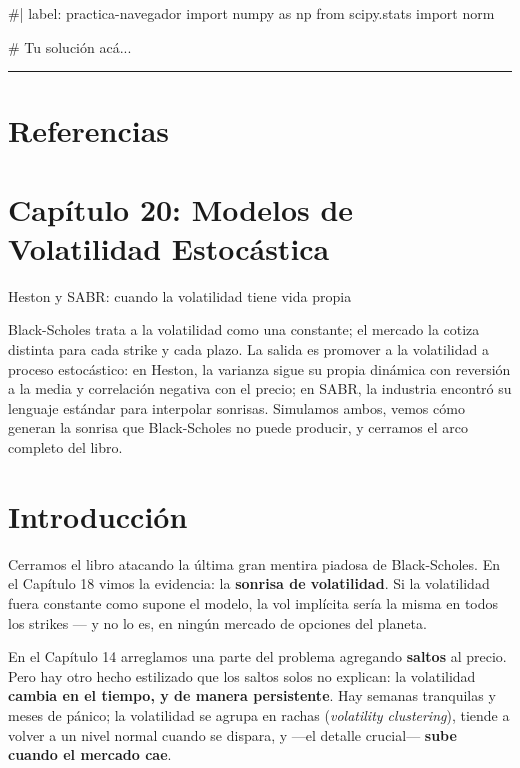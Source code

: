 \documentclass[
  spanish,
  letterpaper,
  DIV=11,
  numbers=noendperiod]{scrreprt}
\newenvironment{Shaded}{\begin{snugshade}}{\end{snugshade}}
\newcommand{\NormalTok}[1]{\textcolor[rgb]{0.00,0.23,0.31}{#1}}
\begin{document}
\begin{Shaded}
\begin{Highlighting}[]
\NormalTok{\#| label: practica{-}navegador}
\NormalTok{import numpy as np}
\NormalTok{from scipy.stats import norm}

\NormalTok{\# Tu solución acá...}
\end{Highlighting}
\end{Shaded}

\begin{center}\rule{0.5\linewidth}{0.5pt}\end{center}

\chapter{Referencias}\label{referencias-18}

\label{refs}

\chapter{Capítulo 20: Modelos de Volatilidad
Estocástica}\label{capuxedtulo-20-modelos-de-volatilidad-estocuxe1stica}

Heston y SABR: cuando la volatilidad tiene vida propia

Black-Scholes trata a la volatilidad como una constante; el mercado la
cotiza distinta para cada strike y cada plazo. La salida es promover a
la volatilidad a proceso estocástico: en Heston, la varianza sigue su
propia dinámica con reversión a la media y correlación negativa con el
precio; en SABR, la industria encontró su lenguaje estándar para
interpolar sonrisas. Simulamos ambos, vemos cómo generan la sonrisa que
Black-Scholes no puede producir, y cerramos el arco completo del libro.

\hfill\break

\chapter{Introducción}\label{introducciuxf3n-17}

Cerramos el libro atacando la última gran mentira piadosa de
Black-Scholes. En el Capítulo 18 vimos la evidencia: la \textbf{sonrisa
de volatilidad}. Si la volatilidad fuera constante como supone el
modelo, la vol implícita sería la misma en todos los strikes --- y no lo
es, en ningún mercado de opciones del planeta.

En el Capítulo 14 arreglamos una parte del problema agregando
\textbf{saltos} al precio. Pero hay otro hecho estilizado que los saltos
solos no explican: la volatilidad \textbf{cambia en el tiempo, y de
manera persistente}. Hay semanas tranquilas y meses de pánico; la
volatilidad se agrupa en rachas (\emph{volatility clustering}), tiende a
volver a un nivel normal cuando se dispara, y ---el detalle crucial---
\textbf{sube cuando el mercado cae}.
\end{document}
